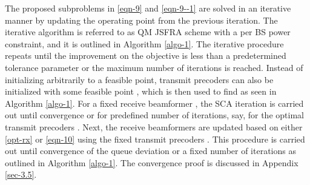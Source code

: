 The proposed subproblems in \eqref{eqn-9} and \eqref{eqn-9--1} are solved in an iterative manner by updating the operating point from the previous iteration. The iterative algorithm is referred to as \acl{QM} \ac{JSFRA} scheme with a per \ac{BS} power constraint, and it is outlined in Algorithm \ref{algo-1}. The iterative procedure repeats until the improvement on the objective is less than a predetermined tolerance parameter or the maximum number of iterations is reached. Instead of initializing  arbitrarily to a feasible point, transmit precoders can also be initialized with some feasible point , which is then used to find  as seen in Algorithm \ref{algo-1}. For a fixed receive beamformer , the \ac{SCA} iteration is carried out until convergence or for predefined number of iterations, say,  for the optimal transmit precoders . Next, the receive beamformers are updated based on either \eqref{opt-rx} or \eqref{eqn-10} using the fixed transmit precoders . This procedure is carried out until convergence of the queue deviation or a fixed number of iterations  as outlined in Algorithm \ref{algo-1}. The convergence proof is discussed in Appendix \ref{sec-3.5}.

